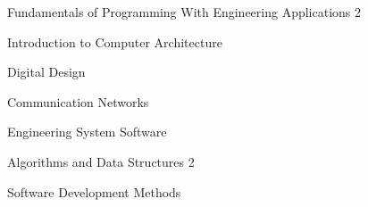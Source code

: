 	\vspace{-8mm}
	{ 
		\begin{cvitems}
		\item Fundamentals of Programming With Engineering Applications 2
		\item Introduction to Computer Architecture
		\item Digital Design
		\item Communication Networks
		\item Engineering System Software
		\item Algorithms and Data Structures 2
		\item Software Development Methods
		\end{cvitems}
	}
	\vspace{-2mm}
